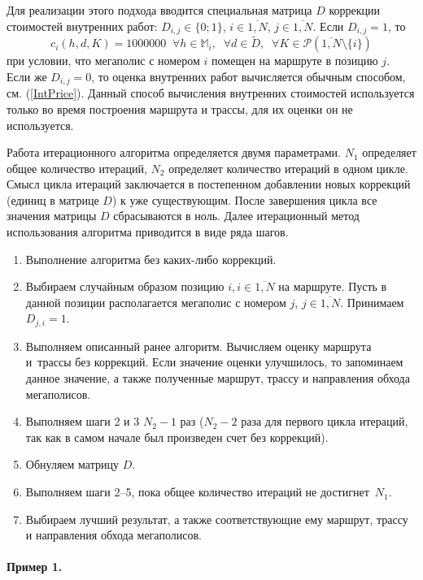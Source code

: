 Для реализации этого подхода вводится специальная матрица
$D$ коррекции стоимостей внутренних работ:
$D_{i,j}\in \{0;1\}$, $i\in \overline{1,N}$, $j\in \overline{1,N}$.
Если $D_{i,j}=1$, то
$$
  c_i(h,d,K)=1000000\;\; \forall h\in \mathbb{M}_i,\;\;
  \forall d\in \tilde{D},\;\;\forall K\in \mathcal{P}(\overline{1,N}\setminus \{i\})
$$
при условии, что мегаполис с номером $i$ помещен на маршруте в позицию $j$.
Если же $D_{i,j}=0$,
то оценка внутренних работ вычисляется обычным способом,
см. (\ref{IntPrice}).
Данный способ вычисления внутренних стоимостей используется
только во время построения маршрута и трассы,
для их оценки он не используется.

Работа итерационного алгоритма определяется двумя параметрами.
$N_1$ определяет общее количество итераций,
$N_2$ определяет количество итераций в одном цикле.
Смысл цикла итераций заключается в постепенном добавлении новых коррекций
(единиц в матрице $D$)
к уже существующим.
После завершения цикла все значения матрицы $D$ сбрасываются в ноль.
Далее итерационный метод использования алгоритма приводится в виде ряда шагов.

\begin{enumerate}
  \item
  Выполнение алгоритма без каких-либо коррекций.
  \item
  Выбираем случайным образом позицию
  $i,i\in \overline{1,N}$ на маршруте.
  Пусть в данной позиции располагается мегаполис с номером
  $j$, $j\in \overline{1,N}$.
  Принимаем $D_{j,i}=1$.
  \item
  Выполняем описанный ранее алгоритм.
  Вычисляем оценку маршрута и~трассы без коррекций.
  Если значение оценки улучшилось, то запоминаем данное значение,
  а также полученные маршрут, трассу и направления обхода мегаполисов.
  \item
  Выполняем шаги 2 и 3 $N_2-1$ раз
  ($N_2-2$ раза для первого цикла итераций,
  так как в самом начале был произведен счет без коррекций).
  \item
  Обнуляем матрицу $D$.
  \item
  Выполняем шаги 2--5,
  пока общее количество итераций не \mbox{достигнет $N_1$}.
  \item
  Выбираем лучший результат,
  а также соответствующие ему маршрут, трассу
  и направления обхода мегаполисов.
\end{enumerate}

\paragraph*{Пример 1.}

